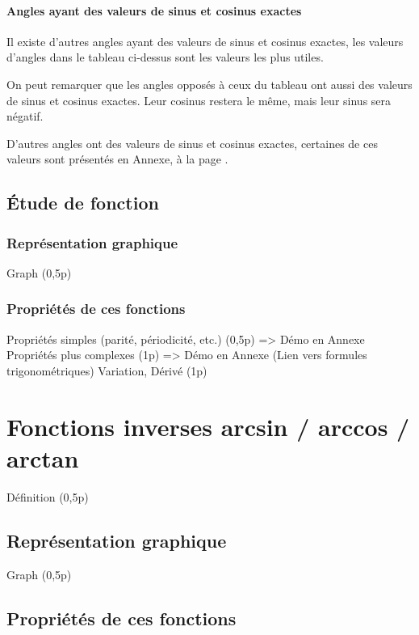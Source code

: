 \documentclass[a4paper]{article}
\begin{document}
			\paragraph*{Angles ayant des valeurs de sinus et cosinus exactes}

			Il existe d'autres angles ayant des valeurs de sinus et cosinus exactes,
			les valeurs d'angles dans le tableau ci-dessus sont les valeurs les plus utiles.

			On peut remarquer que les angles opposés à ceux du tableau ont aussi 
			des valeurs de sinus et cosinus exactes.
			Leur cosinus restera le même, mais leur sinus sera négatif. 
			
			D'autres angles ont des valeurs de sinus et cosinus exactes,
			certaines de ces valeurs sont présentés en Annexe, à la page \pageref{valeur_remarquable_trigo}.

		\subsection{Étude de fonction}

			\subsubsection{Représentation graphique}
				Graph (0,5p)

			\subsubsection{Propriétés de ces fonctions}
				Propriétés simples (parité, périodicité, etc.) (0,5p) => Démo en Annexe
				Propriétés plus complexes (1p) => Démo en Annexe (Lien vers formules trigonométriques)
				Variation, Dérivé (1p)

			

	\section{Fonctions inverses arcsin / arccos / arctan}

			Définition (0,5p)

		\subsection{Représentation graphique}
			Graph (0,5p)

		\subsection{Propriétés de ces fonctions}
\end{document}
